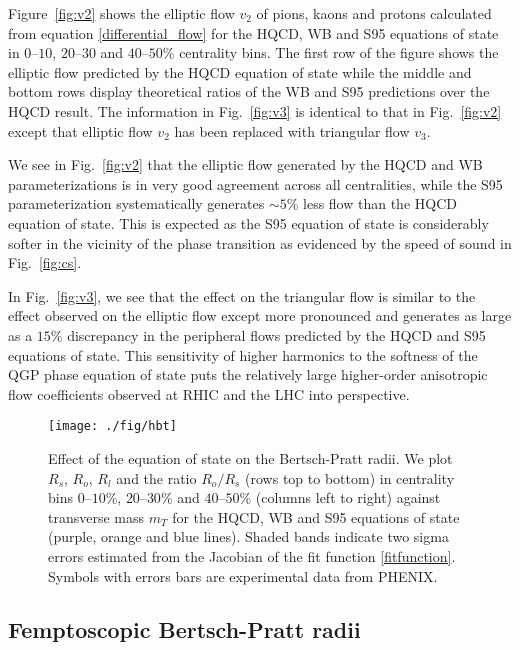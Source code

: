 \documentclass[aps,prc,reprint,amsmath,nofootinbib,superscriptaddress]{revtex4-1}
\begin{document}
Figure~\ref{fig:v2} shows the elliptic flow $v_2$ of pions, kaons and protons calculated from equation \eqref{differential_flow} for the HQCD, WB and S95 equations of state in $0$--$10$, $20$--$30$ and $40$--$50\%$ centrality bins. 
The first row of the figure shows the elliptic flow predicted by the HQCD equation of state while the middle and bottom rows display theoretical ratios of the WB and S95 predictions over the HQCD result. The information
in Fig.~\ref{fig:v3} is identical to that in Fig.~\ref{fig:v2} except that elliptic flow $v_2$ has been replaced with triangular flow $v_3$.

We see in Fig.~\ref{fig:v2} that the elliptic flow generated by the HQCD and WB parameterizations is in very good agreement across all centralities, while the S95 parameterization systematically generates $\sim \! 5\%$ less flow than the HQCD equation of state. This is expected as the S95 equation of state is considerably softer in the vicinity of the phase transition as evidenced by the speed of sound in Fig.~\ref{fig:cs}. 

In Fig.~\ref{fig:v3}, we see that the effect on the triangular flow is similar to the effect observed on the elliptic flow except more pronounced and generates as large as a $15\%$ discrepancy in the peripheral flows predicted by the HQCD and S95 equations of state. This sensitivity of higher harmonics to the softness of the QGP phase equation of state puts the relatively large higher-order anisotropic flow coefficients observed at RHIC and the LHC into perspective. 

\begin{figure*}[t]
  \texttt{[image: ./fig/hbt]}
  \caption{
    \label{fig:hbt} Effect of the equation of state on the Bertsch-Pratt radii.  We plot $R_s$, $R_o$, $R_l$ and the ratio $R_o/R_s$ (rows top to bottom) 
    in centrality bins $0$--$10\%$, $20$--$30\%$ and $40$--$50\%$ (columns left to right) against transverse mass $m_T$ for the HQCD, WB  and S95 equations of state 
    (purple, orange and blue lines). Shaded bands indicate two sigma errors estimated from the Jacobian of the fit function \eqref{fitfunction}. Symbols with errors bars 
    are experimental data from PHENIX.  
  }
\end{figure*}

\subsection{Femptoscopic Bertsch-Pratt radii}
\label{hbt}
\end{document}
